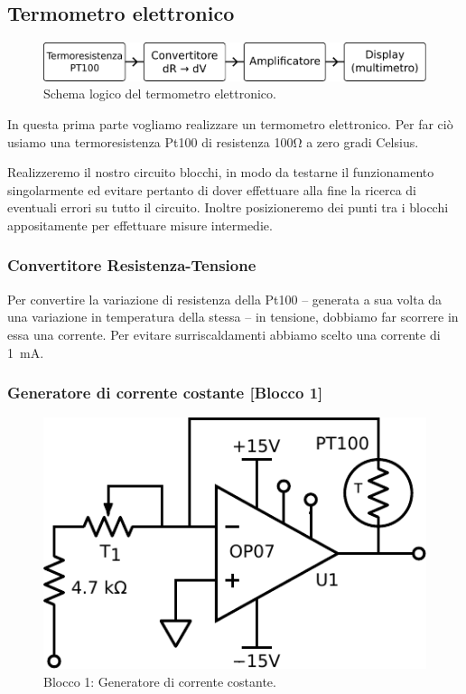 \subsection{Termometro elettronico}

\begin{figure}
\centering
\includegraphics[width=.6\textwidth]{../E06/latex/s1.pdf}
\caption{Schema logico del termometro elettronico.}
\label{fig5:scheme1}
\end{figure}

In questa prima parte vogliamo realizzare un termometro elettronico.
Per far ciò usiamo una termoresistenza Pt100 di resistenza 100\si{\ohm} a zero gradi Celsius.

Realizzeremo il nostro circuito blocchi, in modo da testarne il funzionamento singolarmente ed evitare pertanto di dover effettuare alla fine la ricerca di eventuali errori su tutto il circuito.
Inoltre posizioneremo dei punti tra i blocchi appositamente per effettuare misure intermedie.

\subsubsection{Convertitore Resistenza-Tensione}
Per convertire la variazione di resistenza della Pt100 -- generata a sua volta da una variazione in temperatura della stessa -- in tensione, dobbiamo far scorrere in essa una corrente.
Per evitare surriscaldamenti abbiamo scelto una corrente di \SI{1}{\milli\ampere}.
%
\subsubsection*{Generatore di corrente costante [Blocco 1]}

\begin{figure}
\centering
\includegraphics[width=.3\textwidth]{../E06/latex/P1.pdf}
\caption{Blocco 1: Generatore di corrente costante.}
\label{cir5:2wire}
\end{figure}

